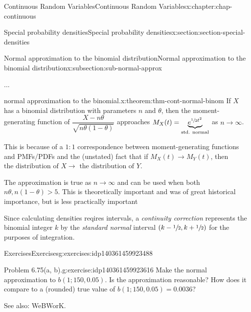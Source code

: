 \documentclass[oneside,10pt,]{book}
\numberwithin{equation}{section}
\newcommand{\gt}{>}
\begin{document}
\begin{chapterptx}{Continuous Random Variables}{}{Continuous Random Variables}{}{}{x:chapter:chap-continuous}
\begin{sectionptx}{Special probability densities}{}{Special probability densities}{}{}{x:section:section-special-densities}
%
%
\typeout{************************************************}
\typeout{************************************************}
%
\begin{subsectionptx}{Normal approximation to the binomial distribution}{}{Normal approximation to the binomial distribution}{}{}{x:subsection:sub-normal-approx}
\begin{introduction}{}%
...%
\end{introduction}%
\begin{theorem}{normal approximation to the binomial.}{}{x:theorem:thm-cont-normal-binom}%
If \(X\) has a binomial distribution with parameters \(n\) and \(\theta\), then the moment-generating function of \(\dfrac{X-n\theta}{\sqrt{n\theta(1-\theta)}}\) approaches \(M_X(t) =
\underbrace{e^{\sfrac{1}{2}t^2}}_{\text{std. normal}}\) as \(n\to\infty\).%
\end{theorem}
This is because of a \(1:1\) correspondence between moment-generating functions and PMFs\slash{}PDFs and the (unstated) fact that if \(M_X(t) \to M_Y(t)\), then \(\text{the distribution of }X
\to\text{ the distribution of }Y\).%
\par
The approximation is true as \(n\to\infty\) and can be used when both \(n\theta, n(1-\theta) \gt 5\).  This is theoretically important and was of great historical importance, but is less practically important%
\par
Since calculating densities reqires intervals, a \emph{continuity correction} represents the binomial integer \(k\) by the \emph{standard normal} interval \((k-\sfrac{1}{2},
k+\sfrac{1}{2})\) for the purposes of integration.%
%
%
\typeout{************************************************}
\typeout{************************************************}
%
\begin{exercises-subsubsection}{Exercises}{}{Exercises}{}{}{g:exercises:idp140361459923488}
\begin{divisionexercise}{1}{Problem 6.75(a, b).}{}{g:exercise:idp140361459923616}%
Make the normal approximation to \(b(1; 150, 0.05)\). Is the approximation reasonable? How does it compare to a (rounded) true value of \(b(1;
150, 0.05) = 0.0036\)?%
\end{divisionexercise}%
See also: WeBWorK.%
\end{exercises-subsubsection}
\end{subsectionptx}
\end{sectionptx}
\end{chapterptx}
\end{document}
